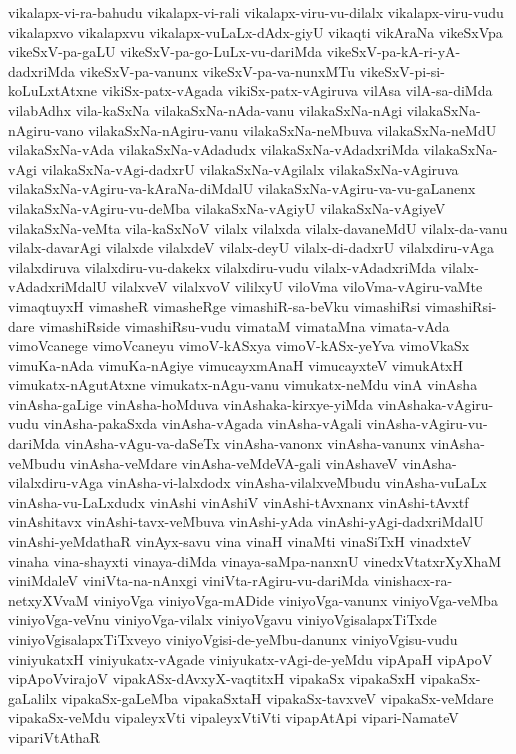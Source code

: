 {vikalapx-vi-ra-bahudu
vikalapx-vi-rali
vikalapx-viru-vu-dilalx
vikalapx-viru-vudu
vikalapxvo
vikalapxvu
vikalapx-vuLaLx-dAdx-giyU
vikaqti
vikAraNa
vikeSxVpa
vikeSxV-pa-gaLU
vikeSxV-pa-go-LuLx-vu-dariMda
vikeSxV-pa-kA-ri-yA-dadxriMda
vikeSxV-pa-vanunx
vikeSxV-pa-va-nunxMTu
vikeSxV-pi-si-koLuLxtAtxne
vikiSx-patx-vAgada
vikiSx-patx-vAgiruva
vilAsa
vilA-sa-diMda
vilabAdhx
vila-kaSxNa
vilakaSxNa-nAda-vanu
vilakaSxNa-nAgi
vilakaSxNa-nAgiru-vano
vilakaSxNa-nAgiru-vanu
vilakaSxNa-neMbuva
vilakaSxNa-neMdU
vilakaSxNa-vAda
vilakaSxNa-vAdadudx
vilakaSxNa-vAdadxriMda
vilakaSxNa-vAgi
vilakaSxNa-vAgi-dadxrU
vilakaSxNa-vAgilalx
vilakaSxNa-vAgiruva
vilakaSxNa-vAgiru-va-kAraNa-diMdalU
vilakaSxNa-vAgiru-va-vu-gaLanenx
vilakaSxNa-vAgiru-vu-deMba
vilakaSxNa-vAgiyU
vilakaSxNa-vAgiyeV
vilakaSxNa-veMta
vila-kaSxNoV
vilalx
vilalxda
vilalx-davaneMdU
vilalx-da-vanu
vilalx-davarAgi
vilalxde
vilalxdeV
vilalx-deyU
vilalx-di-dadxrU
vilalxdiru-vAga
vilalxdiruva
vilalxdiru-vu-dakekx
vilalxdiru-vudu
vilalx-vAdadxriMda
vilalx-vAdadxriMdalU
vilalxveV
vilalxvoV
vililxyU
viloVma
viloVma-vAgiru-vaMte
vimaqtuyxH
vimasheR
vimasheRge
vimashiR-sa-beVku
vimashiRsi
vimashiRsi-dare
vimashiRside
vimashiRsu-vudu
vimataM
vimataMna
vimata-vAda
vimoVcanege
vimoVcaneyu
vimoV-kASxya
vimoV-kASx-yeYva
vimoVkaSx
vimuKa-nAda
vimuKa-nAgiye
vimucayxmAnaH
vimucayxteV
vimukAtxH
vimukatx-nAgutAtxne
vimukatx-nAgu-vanu
vimukatx-neMdu
vinA
vinAsha
vinAsha-gaLige
vinAsha-hoMduva
vinAshaka-kirxye-yiMda
vinAshaka-vAgiru-vudu
vinAsha-pakaSxda
vinAsha-vAgada
vinAsha-vAgali
vinAsha-vAgiru-vu-dariMda
vinAsha-vAgu-va-daSeTx
vinAsha-vanonx
vinAsha-vanunx
vinAsha-veMbudu
vinAsha-veMdare
vinAsha-veMdeVA-gali
vinAshaveV
vinAsha-vilalxdiru-vAga
vinAsha-vi-lalxdodx
vinAsha-vilalxveMbudu
vinAsha-vuLaLx
vinAsha-vu-LaLxdudx
vinAshi
vinAshiV
vinAshi-tAvxnanx
vinAshi-tAvxtf
vinAshitavx
vinAshi-tavx-veMbuva
vinAshi-yAda
vinAshi-yAgi-dadxriMdalU
vinAshi-yeMdathaR
vinAyx-savu
vina
vinaH
vinaMti
vinaSiTxH
vinadxteV
vinaha
vina-shayxti
vinaya-diMda
vinaya-saMpa-nanxnU
vinedxVtatxrXyXhaM
viniMdaleV
viniVta-na-nAnxgi
viniVta-rAgiru-vu-dariMda
vinishacx-ra-netxyXVvaM
viniyoVga
viniyoVga-mADide
viniyoVga-vanunx
viniyoVga-veMba
viniyoVga-veVnu
viniyoVga-vilalx
viniyoVgavu
viniyoVgisalapxTiTxde
viniyoVgisalapxTiTxveyo
viniyoVgisi-de-yeMbu-danunx
viniyoVgisu-vudu
viniyukatxH
viniyukatx-vAgade
viniyukatx-vAgi-de-yeMdu
vipApaH
vipApoV
vipApoVvirajoV
vipakASx-dAvxyX-vaqtitxH
vipakaSx
vipakaSxH
vipakaSx-gaLalilx
vipakaSx-gaLeMba
vipakaSxtaH
vipakaSx-tavxveV
vipakaSx-veMdare
vipakaSx-veMdu
vipaleyxVti
vipaleyxVtiVti
vipapAtApi
vipari-NamateV
vipariVtAthaR
}
